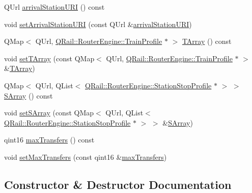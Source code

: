 \begin{DoxyCompactItemize}
\item 
Q\+Url \mbox{\hyperlink{classQRail_1_1RouterEngine_1_1Journey_a94616e16630e6047dd4770e723ec4bfa}{arrival\+Station\+U\+RI}} () const
\item 
void \mbox{\hyperlink{classQRail_1_1RouterEngine_1_1Journey_a9de983071525978f05440677003566df}{set\+Arrival\+Station\+U\+RI}} (const Q\+Url \&\mbox{\hyperlink{classQRail_1_1RouterEngine_1_1Journey_a94616e16630e6047dd4770e723ec4bfa}{arrival\+Station\+U\+RI}})
\item 
Q\+Map$<$ Q\+Url, \mbox{\hyperlink{classQRail_1_1RouterEngine_1_1TrainProfile}{Q\+Rail\+::\+Router\+Engine\+::\+Train\+Profile}} $\ast$ $>$ \mbox{\hyperlink{classQRail_1_1RouterEngine_1_1Journey_ab35795d36beaf773a9946c2b217ecca1}{T\+Array}} () const
\item 
void \mbox{\hyperlink{classQRail_1_1RouterEngine_1_1Journey_acbdb23fc240d5344a20a753bcbb332d5}{set\+T\+Array}} (const Q\+Map$<$ Q\+Url, \mbox{\hyperlink{classQRail_1_1RouterEngine_1_1TrainProfile}{Q\+Rail\+::\+Router\+Engine\+::\+Train\+Profile}} $\ast$ $>$ \&\mbox{\hyperlink{classQRail_1_1RouterEngine_1_1Journey_ab35795d36beaf773a9946c2b217ecca1}{T\+Array}})
\item 
Q\+Map$<$ Q\+Url, Q\+List$<$ \mbox{\hyperlink{classQRail_1_1RouterEngine_1_1StationStopProfile}{Q\+Rail\+::\+Router\+Engine\+::\+Station\+Stop\+Profile}} $\ast$ $>$ $>$ \mbox{\hyperlink{classQRail_1_1RouterEngine_1_1Journey_a737847fba5cb96e84825dc5b28f4e8f2}{S\+Array}} () const
\item 
void \mbox{\hyperlink{classQRail_1_1RouterEngine_1_1Journey_a2f7b14171b6f2fbfcb3f5b5225e8f630}{set\+S\+Array}} (const Q\+Map$<$ Q\+Url, Q\+List$<$ \mbox{\hyperlink{classQRail_1_1RouterEngine_1_1StationStopProfile}{Q\+Rail\+::\+Router\+Engine\+::\+Station\+Stop\+Profile}} $\ast$ $>$ $>$ \&\mbox{\hyperlink{classQRail_1_1RouterEngine_1_1Journey_a737847fba5cb96e84825dc5b28f4e8f2}{S\+Array}})
\item 
qint16 \mbox{\hyperlink{classQRail_1_1RouterEngine_1_1Journey_aa32ea56927a1727c3ab17b6ae584bbed}{max\+Transfers}} () const
\item 
void \mbox{\hyperlink{classQRail_1_1RouterEngine_1_1Journey_ae05e37a29d946f407d3e85e44665b420}{set\+Max\+Transfers}} (const qint16 \&\mbox{\hyperlink{classQRail_1_1RouterEngine_1_1Journey_aa32ea56927a1727c3ab17b6ae584bbed}{max\+Transfers}})
\end{DoxyCompactItemize}


\subsection{Constructor \& Destructor Documentation}
\mbox{\label{classQRail_1_1RouterEngine_1_1Journey_af49050161e106f4c47cbddc8d82ebaa0}} 
